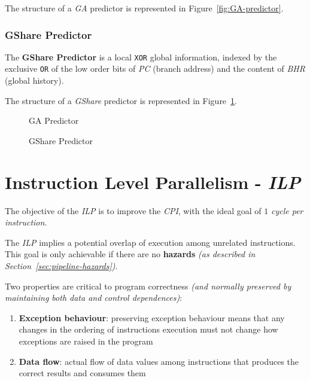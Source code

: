 \documentclass[english]{article}
\begin{document}
The structure of a \textit{GA} predictor is represented in Figure~\ref{fig:GA-predictor}.

\subsubsection{GShare Predictor}

The \textbf{GShare Predictor} is a local \texttt{XOR} global information, indexed by the exclusive \texttt{OR} of the low order bits of \textit{PC} (branch address) and the content of \textit{BHR} (global history).

The structure of a \textit{GShare} predictor is represented in Figure~\ref{fig:GShare-predictor}.

\begin{figure}[htbp]
  \bigskip
  \centering
  \begin{minipage}[b]{0.6\textwidth}
    \centering
    \caption{GA Predictor}
    \label{fig:GA-predictor}
  \end{minipage}
  \begin{minipage}[b]{0.39\textwidth}
    \centering
    \caption{GShare Predictor}
    \label{fig:GShare-predictor}
  \end{minipage}
  \bigskip
\end{figure}

\clearpage

\section{Instruction Level Parallelism - \textit{ILP}}

The objective of the \textit{ILP} is to improve the \textit{CPI}, with the ideal goal of \(1\) \textit{cycle per instruction}.

The \textit{ILP} implies a potential overlap of execution among unrelated instructions.
This goal is only achievable if there are no \textbf{hazards} \textit{(as described in Section~\ref{sec:pipeline-hazards})}.

\bigskip
Two properties are critical to program correctness \textit{(and normally preserved by maintaining both data and control dependences)}:

\begin{enumerate}
  \item \textbf{Exception behaviour}: preserving exception behaviour means that any changes in the ordering of instructions execution must not change how exceptions are raised in the program
  \item \textbf{Data flow}: actual flow of data values among instructions that produces the correct results and consumes them
\end{enumerate}
\end{document}
